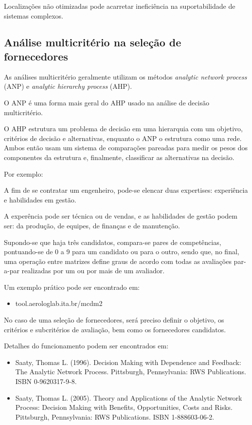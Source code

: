 \documentclass{article}
\begin{document}
Localizações não otimizadas pode acarretar ineficiência na suportabilidade de sistemas complexos.

\subsection{Análise multicritério na seleção de fornecedores}

As análises multicritério geralmente utilizam os métodos {\it analytic network process} (ANP) e {\it analytic hierarchy process} (AHP).

O ANP é uma forma mais geral do AHP usado na análise de decisão multicritério.

O AHP estrutura um problema de decisão em uma hierarquia com um objetivo, critérios de decisão e alternativas, enquanto o ANP o estrutura como uma rede. Ambos então usam um sistema de comparações pareadas para medir os pesos dos componentes da estrutura e, finalmente, classificar as alternativas na decisão.

Por exemplo:

A fim de se contratar um engenheiro, pode-se elencar duas expertises: experiência e habilidades em gestão.

A experência pode ser técnica ou de vendas, e as habilidades de gestão podem ser: da produção, de equipes, de finanças e de manutenção.

Supondo-se que haja três candidatos, compara-se pares de competências, pontuando-se de 0 a 9 para um candidato ou para o outro, sendo que, no final, uma operação entre matrizes define graus de acordo com todas as avaliações par-a-par realizadas por um ou por mais de um avaliador.

Um exemplo prático pode ser encontrado em:

\begin{itemize}
\item tool.aerologlab.ita.br/mcdm2
\end{itemize}

No caso de uma seleção de fornecedores, será preciso definir o objetivo, os critérios e subcritérios de avaliação, bem como os fornecedores candidatos.

Detalhes do funcionamento podem ser encontrados em:

\begin{itemize}
\item Saaty, Thomas L. (1996). Decision Making with Dependence and Feedback: The Analytic Network Process. Pittsburgh, Pennsylvania: RWS Publications. ISBN 0-9620317-9-8.

\item Saaty, Thomas L. (2005). Theory and Applications of the Analytic Network Process: Decision Making with Benefits, Opportunities, Costs and Risks. Pittsburgh, Pennsylvania: RWS Publications. ISBN 1-888603-06-2.
\end{itemize}
\end{document}
